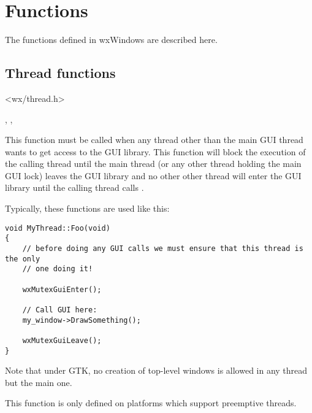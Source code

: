 \chapter{Functions}\label{functions}
%
\setfooter{\thepage}{}{}{}{}{\thepage}

The functions defined in wxWindows are described here.

\section{Thread functions}\label{threadfunctions}


<wx/thread.h>


, , 

\label{wxmutexguienter}


This function must be called when any thread other than the main GUI thread
wants to get access to the GUI library. This function will block the execution
of the calling thread until the main thread (or any other thread holding the
main GUI lock) leaves the GUI library and no other other thread will enter
the GUI library until the calling thread calls .

Typically, these functions are used like this:

\begin{verbatim}
void MyThread::Foo(void)
{
    // before doing any GUI calls we must ensure that this thread is the only
    // one doing it!

    wxMutexGuiEnter();

    // Call GUI here:
    my_window->DrawSomething();
    
    wxMutexGuiLeave();
}
\end{verbatim}

Note that under GTK, no creation of top-level windows is allowed in any
thread but the main one.

This function is only defined on platforms which support preemptive
threads. 

\label{wxmutexguileave}

